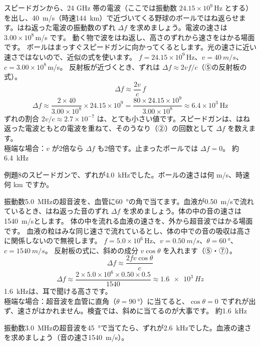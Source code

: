 \label{ph:波-8:ex8}
\begin{phreidai}[スピードガン]
スピードガンから、24 GHz 帯の電波（ここでは振動数 $24.15\times10^9$\,Hz とする）を出し、\qty{40}{m/s}（時速\qty{144}{km}）で近づいてくる野球のボールではね返らせます。はね返った電波の振動数のずれ $\Delta f$ を求めましょう。電波の速さは $3.00\times10^8$\,m/s です。
\phbamen
動く物で波をはね返し、高さのずれから速さをはかる場面です。
\phmushi
ボールはまっすぐスピードガンに向かってくるとします。光の速さに近い速さではないので、近似の式を使います。
\phzu
$f=24.15\times10^9$\,Hz、$v=\qty{40}{m/s}$、$c=3.00\times10^8$\,m/s。
\phriyu
反射板が近づくとき、ずれは $\Delta f\approx2vf/c$（⑤の反射板の式）。
\phtateru
\[\Delta f\approx\frac{2v}{c}\,f\]
\phtoku
\[\Delta f\approx\frac{2\times40}{3.00\times10^8}\times24.15\times10^9=\frac{80\times24.15\times10^9}{3.00\times10^8}\approx6.4\times10^3\ \text{Hz}\]
\phtashikame
ずれの割合 $2v/c\approx2.7\times10^{-7}$ は、とても小さい値です。スピードガンは、はね返った電波ともとの電波を重ねて、そのうなり（②）の回数として $\Delta f$ を数えます。\\
極端な場合：$v$ が2倍なら $\Delta f$ も2倍です。止まったボールでは $\Delta f=0$。
\kotae 約\qty{6.4}{kHz}
\end{phreidai}
\begin{jibun}
例題8のスピードガンで、ずれが\qty{4.0}{kHz}でした。ボールの速さは何 m/s、時速何 km ですか。
\end{jibun}

\label{ph:波-8:ex9}
\begin{phreidai}[血液の流れの速さ]
振動数\qty{5.0}{MHz}の超音波を、血管に\qty{60}{\degree}の角で当てます。血液が\qty{0.50}{m/s}で流れているとき、はね返った音のずれ $\Delta f$ を求めましょう。体の中の音の速さは\qty{1540}{m/s}とします。
\phbamen
体の中を流れる血液の速さを、外から超音波ではかる場面です。
\phmushi
血液の粒はみな同じ速さで流れているとし、体の中での音の吸収は高さに関係しないので無視します。
\phzu
$f=5.0\times10^6$\,Hz、$v=\qty{0.50}{m/s}$、$\theta=\qty{60}{\degree}$、$c=\qty{1540}{m/s}$。
\phriyu
反射板の式に、斜めの成分 $v\cos\theta$ を入れます（⑤・⑦）。
\phtateru
\[\Delta f\approx\frac{2fv\cos\theta}{c}\]
\phtoku
\[\Delta f\approx\frac{2\times5.0\times10^6\times0.50\times0.5}{1540}\approx\qty{1.6e3}{Hz}\]
\phtashikame
\qty{1.6}{kHz}は、耳で聞ける高さです。\\
極端な場合：超音波を血管に直角（$\theta=\qty{90}{\degree}$）に当てると、$\cos\theta=0$ でずれが出ず、速さがはかれません。検査では、斜めに当てるのが大事です。
\kotae 約\qty{1.6}{kHz}
\end{phreidai}
\begin{jibun}
振動数\qty{3.0}{MHz}の超音波を\qty{45}{\degree}で当てたら、ずれが\qty{2.6}{kHz}でした。血液の速さを求めましょう（音の速さ\qty{1540}{m/s}）。
\end{jibun}

